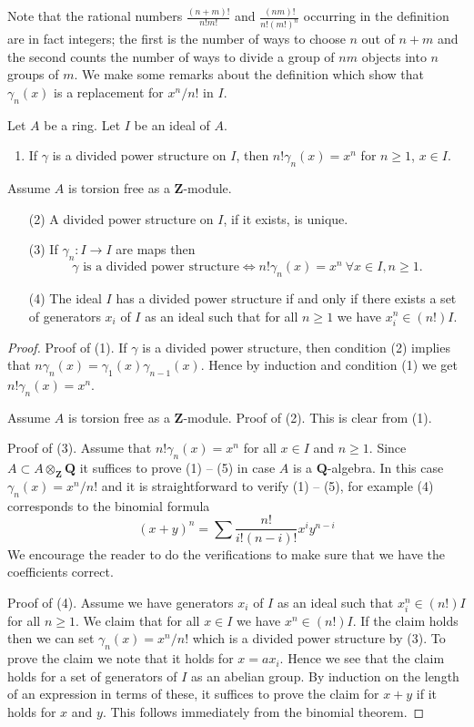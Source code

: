 \noindent
Note that the rational numbers $\frac{(n + m)!}{n! m!}$
and $\frac{(nm)!}{n! (m!)^n}$ occurring in the definition are in fact integers;
the first is the number of ways to choose $n$ out of $n + m$ and
the second counts the number of ways to divide a group of $nm$
objects into $n$ groups of $m$.
We make some remarks about the definition which show that
$\gamma_n(x)$ is a replacement for $x^n/n!$ in $I$.

\begin{lemma}
\label{lemma-silly}
Let $A$ be a ring. Let $I$ be an ideal of $A$.
\begin{enumerate}
\item If $\gamma$ is a divided power structure on $I$, then
$n! \gamma_n(x) = x^n$ for $n \geq 1$, $x \in I$.
\end{enumerate}
Assume $A$ is torsion free as a $\mathbf{Z}$-module.
\begin{enumerate}
\item[(2)] A divided power structure on $I$, if it exists, is unique.
\item[(3)] If $\gamma_n : I \to I$ are maps then
$$
\gamma\text{ is a divided power structure}
\Leftrightarrow
n! \gamma_n(x) = x^n\ \forall x \in I, n \geq 1.
$$
\item[(4)] The ideal $I$ has a divided power structure
if and only if there exists
a set of generators $x_i$ of $I$ as an ideal such that
for all $n \geq 1$ we have $x_i^n \in (n!)I$.
\end{enumerate}
\end{lemma}

\begin{proof}
Proof of (1). If $\gamma$ is a divided power structure, then condition
(2) implies that $n \gamma_n(x) = \gamma_1(x)\gamma_{n - 1}(x)$. Hence
by induction and condition (1) we get $n! \gamma_n(x) = x^n$.

\medskip\noindent
Assume $A$ is torsion free as a $\mathbf{Z}$-module.
Proof of (2). This is clear from (1).

\medskip\noindent
Proof of (3). Assume that $n! \gamma_n(x) = x^n$ for all $x \in I$ and
$n \geq 1$. Since $A \subset A \otimes_{\mathbf{Z}} \mathbf{Q}$ it suffices
to prove (1) -- (5) in case $A$ is a $\mathbf{Q}$-algebra.
In this case $\gamma_n(x) = x^n/n!$ and it is straightforward
to verify (1) -- (5), for example (4) corresponds to the binomial
formula
$$
(x + y)^n = \sum \frac{n!}{i!(n - i)!} x^iy^{n - i}
$$
We encourage the reader to do the verifications
to make sure that we have the coefficients correct.

\medskip\noindent
Proof of (4). Assume we have generators $x_i$ of $I$ as an ideal
such that $x_i^n \in (n!)I$ for all $n \geq 1$. We claim that
for all $x \in I$ we have $x^n \in (n!)I$. If the claim holds then
we can set $\gamma_n(x) = x^n/n!$ which is a divided power structure by (3).
To prove the claim we note that it holds for $x = ax_i$. Hence we see
that the claim holds for a set of generators of $I$ as an abelian group.
By induction on the length of an expression in terms of these, it suffices
to prove the claim for $x + y$ if it holds for $x$ and $y$. This
follows immediately from the binomial theorem.
\end{proof}

